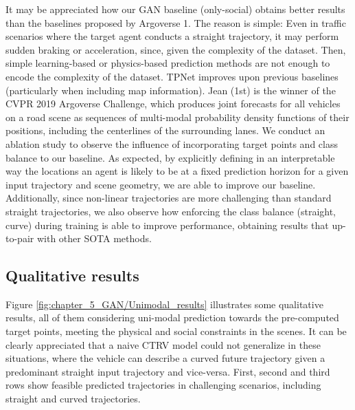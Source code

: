 It may be appreciated how our \ac{GAN} baseline (only-social) obtains better results than the baselines \cite{chang2019argoverse} proposed by Argoverse 1. The reason is simple: Even in traffic scenarios where the target agent conducts a straight trajectory, it may perform sudden braking or acceleration, since, given the complexity of the dataset. Then, simple learning-based or physics-based prediction methods are not enough to encode the complexity of the dataset. TPNet \cite{fang2020tpnet} improves upon previous baselines (particularly when including map information). Jean (1st) \cite{mercat2020multi} is the winner of the CVPR 2019 Argoverse Challenge, which produces joint forecasts for all vehicles on a road scene as sequences of multi-modal probability density functions of their positions, including the centerlines of the surrounding lanes. We conduct an ablation study to observe the influence of incorporating target points and class balance to our baseline. As expected, by explicitly defining in an interpretable way the locations an agent is likely to be at a fixed prediction horizon for a given input trajectory and scene geometry, we are able to improve our baseline. Additionally, since non-linear trajectories are more challenging than standard straight trajectories, we also observe how enforcing the class balance (straight, curve) during training is able to improve performance, obtaining results that up-to-pair with other \ac{SOTA} methods.

\subsection{Qualitative results}
\label{subsec:5_qualitative_results}

Figure \ref{fig:chapter_5_GAN/Unimodal_results} illustrates some qualitative results, all of them considering uni-modal prediction towards the pre-computed target points, meeting the physical and social constraints in the scenes. It can be clearly appreciated that a naive \ac{CTRV} model could not generalize in these situations, where the vehicle can describe a curved future trajectory given a predominant straight input trajectory and vice-versa. First, second and third rows show feasible predicted trajectories in challenging scenarios, including straight and curved trajectories. 

